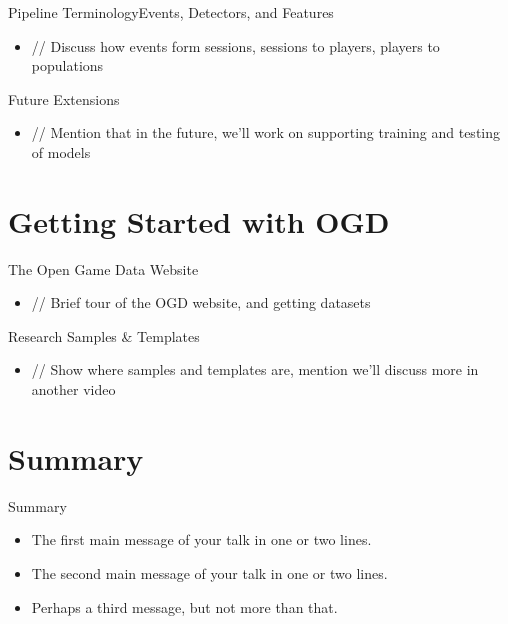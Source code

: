 \documentclass{beamer}
\begin{document}
\begin{frame}{Pipeline Terminology}{Events, Detectors, and Features}
  \begin{itemize}
  \item
    // Discuss how events form sessions, sessions to players, players to populations
    \pause
  \end{itemize}
\end{frame}

\begin{frame}{Future Extensions}
  \begin{itemize}
  \item
    // Mention that in the future, we'll work on supporting training and testing of models
    \pause
  \end{itemize}
\end{frame}

\section[Getting Started]{Getting Started with OGD}

\begin{frame}{The Open Game Data Website}
  \begin{itemize}
  \item
    // Brief tour of the OGD website, and getting datasets
    \pause
  \end{itemize}
\end{frame}

\begin{frame}{Research Samples \& Templates}
  \begin{itemize}
  \item
    // Show where samples and templates are, mention we'll discuss more in another video
    \pause
  \end{itemize}
\end{frame}

\section*{Summary}

\begin{frame}{Summary}
  \begin{itemize}
  \item
    The \alert{first main message} of your talk in one or two lines.
  \item
    The \alert{second main message} of your talk in one or two lines.
  \item
    Perhaps a \alert{third message}, but not more than that.
  \end{itemize}
\end{frame}
\end{document}
